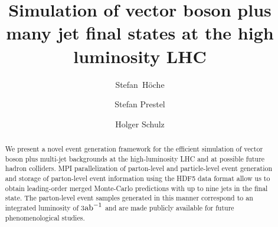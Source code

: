 \documentclass[aps,prd,twocolumn,fleqn,superscriptaddress,groupedaddress,nofootinbib,preprintnumbers]{revtex4}
\begin{document}
\title{Simulation of vector boson plus many jet 
  final states at the high luminosity LHC}
\author{Stefan~H{\"o}che}
\author{Stefan Prestel}
\author{Holger Schulz}

\begin{abstract}
  We present a novel event generation framework for the efficient 
  simulation of vector boson plus multi-jet backgrounds at the
  high-luminosity LHC and at possible future hadron colliders.
  MPI parallelization of parton-level and particle-level event
  generation and storage of parton-level event information using
  the HDF5 data format allow us to obtain leading-order merged
  Monte-Carlo predictions with up to nine jets in the final state.
  The parton-level event samples generated in this manner correspond
  to an integrated luminosity of 3${\rm ab}^{-1}$ and are made
  publicly available for future phenomenological studies. 
\end{abstract}

\maketitle
\end{document}

